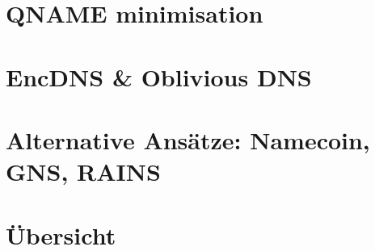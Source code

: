\section{QNAME minimisation}

\section{EncDNS & Oblivious DNS}

\section{Alternative Ansätze: Namecoin, GNS, RAINS}

\section{Übersicht}
